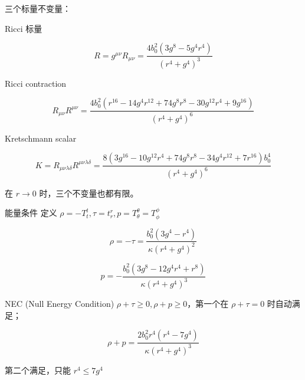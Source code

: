 \documentclass[9pt, dvipsnames]{beamer} %
\begin{document}
\begin{frame}
    三个标量不变量：
    
    Ricci 标量
    
    $$
    R = g^{\mu\nu}R_{\mu\nu}
    =\frac{4b_0^2\left(3g^8-5g^4r^4 \right) }{\left(r^4+g^4 \right)^3 }
    $$
    
    Ricci contraction
    
    $$
    R_{\mu\nu} R^{\mu\nu}
    =\frac{4b_0^2 \left(r^{16}-14g^4r^{12}+74g^8r^8-30g^{12}r^4+9g^{16} \right) }{\left(r^4+g^4 \right)^6 }
    $$
    
    Kretschmann scalar
    
    $$
    K
    =R_{\mu\nu\lambda\delta} R^{\mu\nu\lambda\delta}
    =\frac{8\left(3g^{16}-10g^{12}r^4+74 g^8 r^8-34g^4r^{12}+7r^{16} \right)b_0^4 }{\left(r^4+g^4 \right)^6 }
    $$
    
    在 $r\to 0$ 时，三个不变量也都有限。 
\end{frame}

\begin{frame}{能量条件}
    定义 $\rho=-T_t^t,\tau=t_r^r,p=T_\theta^\theta=T_\phi^\phi $

    $$
    \rho=-\tau
    =\frac{b_0^2\left(3g^4-r^4 \right) }{\kappa \left(r^4+g^4 \right)^2 } 
    $$
    
    $$
    p
    =-\frac{b_0^2\left(3g^8-12g^4r^4+r^8 \right) }{\kappa \left(r^4+g^4 \right)^3 }
    $$
    
    NEC (Null Energy Condition) $\rho+\tau \geqslant 0,\rho+p\geqslant 0 $，第一个在 $\rho+\tau=0 $ 时自动满足；
    
    $$
    \rho+p
    =\frac{2b_0^2 r^4\left(r^4-7g^4 \right) }{\kappa \left(r^4+g^4 \right)^3 }
    $$
    
    第二个满足，只能 $r^4\leqslant 7g^4 $
\end{frame}
\end{document}
